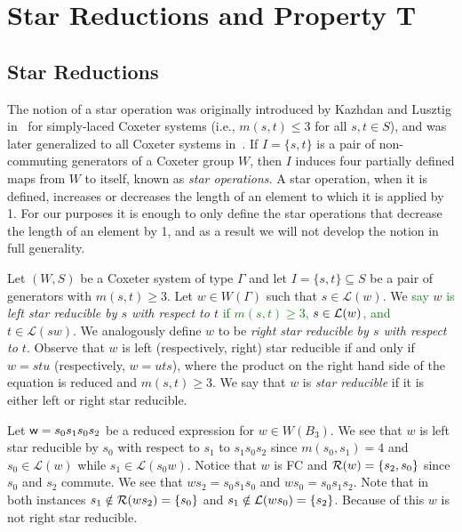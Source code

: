 \chapter{Star Reductions and Property T}


\section{Star Reductions}\label{sec:star}

The notion of a star operation was originally introduced by Kazhdan and Lusztig in~\cite{Kazhdan1979} for simply-laced Coxeter systems (i.e., $m(s,t) \leq 3$ for all $s,t \in S$), and was later generalized to all Coxeter systems in~\cite{Lusztig1985}. If $I=\{s,t\}$ is a pair of non-commuting generators of a Coxeter group $W$, then $I$ induces four partially defined maps from $W$ to itself, known as \emph{star operations}. A star operation, when it is defined, increases or decreases the length of an element to which it is applied by 1. For our purposes it is enough to only define the star operations that decrease the length of an element by 1, and as a result we will not develop the notion in full generality.

Let $(W,S)$ be a Coxeter system of type $\Gamma$ and let $I=\{s,t\}\subseteq S$ be a pair of generators with $m(s,t) \geq 3$. Let $w \in W(\Gamma)$ such that $s \in \mathcal{L}(w)$. We \textcolor{green}{say} $w$ \textcolor{green}{is} \emph{left star reducible by $s$ with respect to $t$} \textcolor{green}{if $m(s,t) \geq 3$, $s \in \mathcal{L}(w)$, and} $t \in \mathcal{L}(sw)$. We analogously define $w$ to be \emph{right star reducible by $s$ with respect to $t$}. Observe that $w$ is left (respectively, right) star reducible if and only if $w=stu$ (respectively, $w=uts$), where the product on the right hand side of the equation is reduced and $m(s,t) \geq 3$. We say that $w$ is \emph{star reducible} if it is either left or right star reducible.

\begin{example}\label{ex:starred}
Let $\mathsf{w}=s_0s_1s_0s_2$ be a reduced expression for $w \in W(B_3)$. We see that $w$ is left star reducible by $s_0$ with respect to $s_1$ to $s_1s_0s_2$ since $m(s_0,s_1)=4$ and $s_0 \in \mathcal{L}(w)$ while $s_1 \in \mathcal{L}(s_0w)$. Notice that $w$ is FC and $\mathcal{R}(w)=\{s_2,s_0\}$ since $s_0$ and $s_2$ commute. We see that $ws_2=s_0s_1s_0$ and $ws_0=s_0s_1s_2$. Note that in both instances $s_1 \notin \mathcal{R}(ws_2)=\{s_0\}$ and $s_1 \notin \mathcal{L}(ws_0)=\{s_2\}$. Because of this $w$ is not right star reducible. 
\end{example}

